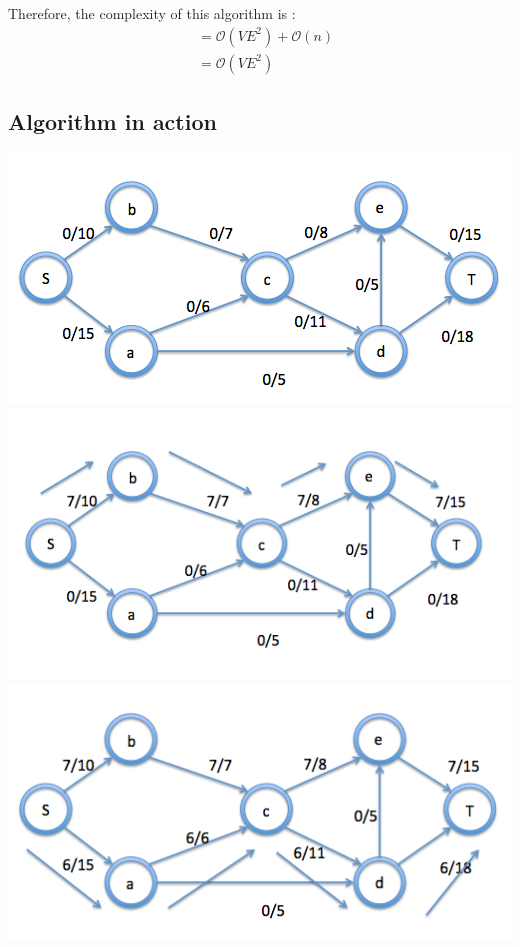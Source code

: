 \documentclass{article}
\begin{document}
Therefore, the complexity of this algorithm is :
\begin{align*}
 & = \mathcal{O}(VE^2) + \mathcal{O}(n) \\
 & = \mathcal{O}(VE^2)
\end{align*}

\newpage
\subsection{Algorithm in action}
\includegraphics[width=\linewidth]{images/1}
\includegraphics[width=\linewidth]{images/2}
\includegraphics[width=\linewidth]{images/3}
\end{document}
